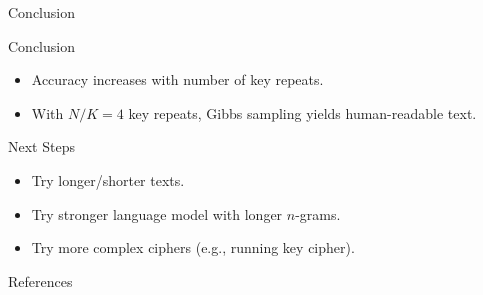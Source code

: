 \documentclass{beamer}
\begin{document}

\begin{frame}{Conclusion}

\begin{block}{Conclusion}
\begin{itemize}
\item Accuracy increases with number of key repeats.
\item With $N/K = 4$ key repeats, Gibbs sampling yields human-readable text.
\end{itemize}
\end{block}

\begin{block}{Next Steps}
\begin{itemize}
\item Try longer/shorter texts.
\item Try stronger language model with longer $n$-grams.
\item Try more complex ciphers (e.g., running key cipher).
\end{itemize}
\end{block}

\end{frame}


\begin{frame}{References}




\end{frame}




\end{document}
